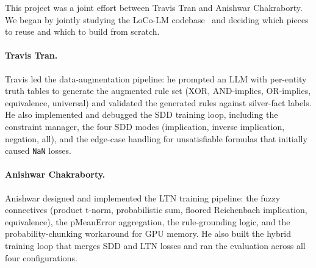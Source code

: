 \documentclass[11pt,a4paper]{article}
\begin{document}
This project was a joint effort between Travis Tran and Anishwar
Chakraborty.  We began by jointly studying the LoCo-LM
codebase~\cite{calanzone2025loco} and deciding which pieces to reuse and
which to build from scratch.

\paragraph{Travis Tran.}
Travis led the data-augmentation pipeline: he prompted an LLM with
per-entity truth tables to generate the augmented rule set (XOR,
AND-implies, OR-implies, equivalence, universal) and validated the
generated rules against silver-fact labels.  He also implemented and
debugged the SDD training loop, including the constraint manager, the
four SDD modes (implication, inverse implication, negation, all), and
the edge-case handling for unsatisfiable formulas that initially caused
\texttt{NaN} losses.

\paragraph{Anishwar Chakraborty.}
Anishwar designed and implemented the LTN training pipeline: the fuzzy
connectives (product t-norm, probabilistic sum, floored Reichenbach
implication, equivalence), the pMeanError aggregation, the rule-grounding
logic, and the probability-chunking workaround for GPU memory.  He also
built the hybrid training loop that merges SDD and LTN losses and ran
the evaluation across all four configurations.


\end{document}
